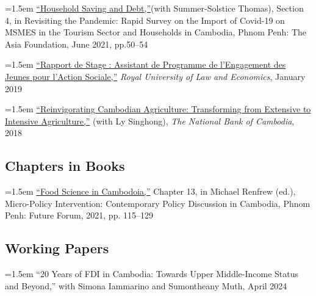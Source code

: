 \documentclass[10pt,a4paper]{article}
\begin{document}
	\hangindent=1.5em
	\href{https://kosalnith.github.io/research/policies/COVID-19-HHSavingsDebt.pdf}{``Household Saving and Debt,”}(with Summer-Solstice Thomas), Section 4, in Revisiting the Pandemic: Rapid Survey on the Import of Covid-19 on MSMES in the Tourism Sector and Households in Cambodia, Phnom Penh: The Asia Foundation, June 2021, pp.50--54\\ \vspace{-.5em} 
			
	\hangindent=1.5em
	\href{https://www.researchgate.net/publication/330936932_Rapport_du_Stage_Assistant_de_Programme_a_l%27YRDP}{``Rapport de Stage : Assistant de Programme de l'Engagement des Jeunes pour l'Action Sociale,”} \textit{Royal University of Law and Economics}, January 2019 \\ \vspace{-.5em}
			
	\hangindent=1.5em
	\href{https://ideas.repec.org/p/pra/mprapa/93086.html}{``Reinvigorating Cambodian Agriculture: Transforming from Extensive to Intensive Agriculture,”} (with Ly Singhong), \textit{The National Bank of Cambodia}, 2018 
\subsection*{Chapters in Books}

\hangindent=1.5em
\href{https://kosalnith.github.io/research/policies/PolicyBrief-FST.pdf}{``Food Science in Cambodoia,''} Chapter 13, in Michael Renfrew (ed.), Micro-Policy Intervention: Contemporary Policy Discussion in Cambodia, Phnom Penh: Future Forum, 2021, pp. 115–129 

\subsection*{Working Papers}

		\hangindent=1.5em
	``20 Years of FDI in Cambodia: Towards Upper Middle-Income Status and Beyond,'' with Simona Iammarino and Sumontheany Muth, April 2024 \\ \vspace{-.5em}
	
\end{document}
